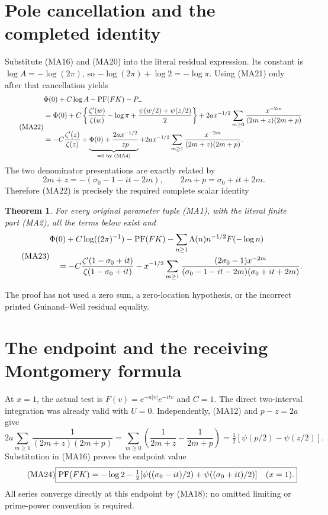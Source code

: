 \documentclass[11pt,a4paper]{article}
\newtheorem{theorem}{Theorem}[section]
\begin{document}
\section{Pole cancellation and the completed identity}
Substitute (MA16) and (MA20) into the literal residual expression. Its
constant is $\log A=-\log(2\pi)$, so $-\log(2\pi)+\log2=-\log\pi$.
Using (MA21) only after that cancellation yields
\begin{equation}\tag{MA22}\begin{aligned}
 &\Phi(0)+C\log A-\operatorname{PF}(FK)-P_-\\
 &=\Phi(0)+C\left\{\frac{\zeta'(w)}{\zeta(w)}-\log\pi
              +\frac{\psi(w/2)+\psi(z/2)}2\right\}
       +2a x^{-1/2}\sum_{m\ge0}\frac{x^{-2m}}{(2m+z)(2m+p)}\\
 &=-C\frac{\zeta'(z)}{\zeta(z)}
   +\underbrace{\Phi(0)+\frac{2a x^{-1/2}}{zp}}_{=0\text{ by (MA4)}}
   +2a x^{-1/2}\sum_{m\ge1}\frac{x^{-2m}}{(2m+z)(2m+p)}.
\end{aligned}\end{equation}
The two denominator presentations are exactly related by
\[
 2m+z=-(\sigma_0-1-it-2m),\qquad 2m+p=\sigma_0+it+2m.
\]
Therefore (MA22) is precisely the required complete scalar identity
\begin{theorem}
For every original parameter tuple (MA1), with the literal finite part
(MA2), all the terms below exist and
\begin{equation}\tag{MA23}\begin{aligned}
 &\Phi(0)+C\log((2\pi)^{-1})-\operatorname{PF}(FK)
   -\sum_{n\ge1}\Lambda(n)n^{-1/2}F(-\log n)\\
 &\quad=-C\frac{\zeta'(1-\sigma_0+it)}{\zeta(1-\sigma_0+it)}
 -x^{-1/2}\sum_{m\ge1}
 \frac{(2\sigma_0-1)x^{-2m}}
      {(\sigma_0-1-it-2m)(\sigma_0+it+2m)}.
\end{aligned}\end{equation}
\end{theorem}
The proof has not used a zero sum, a zero-location hypothesis, or the
incorrect printed Guinand--Weil residual equality.

\section{The endpoint and the receiving Montgomery formula}
At $x=1$, the actual test is $F(v)=e^{-a|v|}e^{-itv}$ and $C=1$.
The direct two-interval integration was already valid with $U=0$.
Independently, (MA12) and $p-z=2a$ give
\[
 2a\sum_{m\ge0}\frac1{(2m+z)(2m+p)}
 =\sum_{m\ge0}\left(\frac1{2m+z}-\frac1{2m+p}\right)
 =\tfrac12[\psi(p/2)-\psi(z/2)].
\]
Substitution in (MA16) proves the endpoint value
\begin{equation}\tag{MA24}
 \boxed{\operatorname{PF}(FK)=-\log2-\tfrac12
 [\psi((\sigma_0-it)/2)+\psi((\sigma_0+it)/2)]\quad(x=1).}
\end{equation}
All series converge directly at this endpoint by (MA18); no omitted
limiting or prime-power convention is required.
\end{document}
